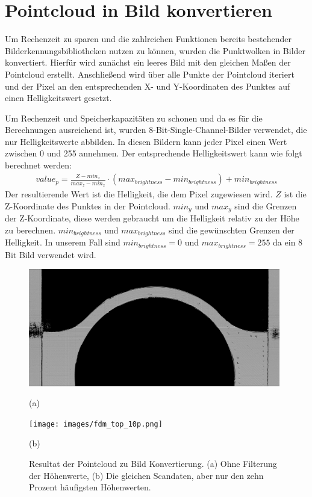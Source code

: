 \section{Pointcloud in Bild konvertieren}

Um Rechenzeit zu sparen und die zahlreichen Funktionen bereits bestehender
 Bilderkennungsbibliotheken nutzen zu können, wurden die Punktwolken in Bilder 
 konvertiert. Hierfür wird zunächst ein leeres Bild mit den gleichen 
 Maßen der Pointcloud erstellt. Anschließend wird über alle Punkte der
 Pointcloud iteriert und der Pixel an den 
 entsprechenden X- und Y-Koordinaten des Punktes auf einen Helligkeitswert gesetzt.

Um Rechenzeit und Speicherkapazitäten zu schonen und 
da es für die Berechnungen ausreichend ist, wurden 
8-Bit-Single-Channel-Bilder verwendet, die nur Helligkeitswerte abbilden. 
In diesen Bildern kann jeder Pixel einen Wert zwischen 0 und 255 annehmen. 
Der entsprechende Helligkeitswert kann wie folgt berechnet werden:
\begin{align}\label{calc:brightness}
    value_p = \frac{Z - min_z}{max_z - min_z} \cdot (max_{brightness} - min_{brightness}) + min_{brightness}
\end{align}
Der resultierende Wert ist die Helligkeit, die dem Pixel zugewiesen wird.
$Z$ ist die Z-Koordinate des Punktes in der Pointcloud. $min_y$ und $max_y$ sind 
die Grenzen der Z-Koordinate, diese werden gebraucht um die Helligkeit relativ 
zu der Höhe zu berechnen. $min_{brightness}$ und $max_{brightness}$ sind die gewünschten Grenzen der 
Helligkeit. In unserem Fall sind $min_{brightness} = 0$ und $max_{brightness} = 255$ da ein 8 Bit Bild
verwendet wird.


\begin{figure}[H]
    \centering
    \begin{minipage}{0.45\textwidth}
        \centering
        \includegraphics[width=0.98\textwidth]{images/fdm_top_100p.png} %
        \caption*{(a)}
    \end{minipage}\hfill
    \begin{minipage}{0.45\textwidth}
        \centering
        \texttt{[image: images/fdm\_top\_10p.png]} %
        \caption*{(b)}
    \end{minipage}
    \caption{Resultat der Pointcloud zu Bild Konvertierung. (a) Ohne Filterung der Höhenwerte, (b) Die gleichen 
    Scandaten, aber nur den zehn Prozent häufigsten Höhenwerten.}
    \label{fig:image_from_pc}
\end{figure}

